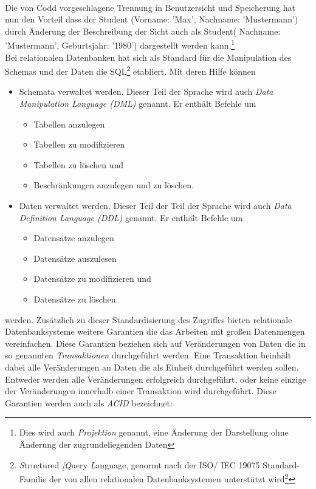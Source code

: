 \\Die von Codd vorgeschlagene Trennung in Benutzersicht und Speicherung hat nun den Vorteil dass der Student (Vorname: 'Max', Nachname: 'Mustermann') durch Änderung der Beschreibung der Sicht auch als Student( Nachname: 'Mustermann', Geburtsjahr: '1980') dargestellt werden kann.\footnote{Dies wird auch \emph{Projektion} genannt, eine Änderung der Darstellung ohne Änderung der zugrundeliegenden Daten\parencite[S. 152]{dbgrund} }
\\Bei relationalen Datenbanken hat sich als Standard für die Manipulation des Schemas und der Daten die SQL\footnote{\emph{S}tructured \emph{[Q}uery \emph{L}anguage, genormt nach der ISO/ IEC 19075 Standard-Familie der von allen relationalen Datenbanksystemen unterstützt wird\parencite{ocl_sql}\parencite{isosql}\footnote{Jeweils mit eigenen, unterschiedlich mächtigen Erweiterungen um den Anwendungsentwicklern einen Austausch des zugrundeliegenden Systems zu erschweren}} etabliert. Mit deren Hilfe können\parencite[S. 182]{dbgrund}
\begin{itemize}
	\item Schemata verwaltet werden. Dieser Teil der Sprache wird auch \emph{Data Manipulation Language (DML)} genannt. Er enthält Befehle um 
	\begin{itemize}
		\item Tabellen anzulegen
		\item Tabellen zu modifizieren
		\item Tabellen zu löschen und
		\item Beschränkungen anzulegen und zu löschen.
	\end{itemize}
	\item Daten verwaltet werden. Dieser Teil der Teil der Sprache wird auch \emph{Data Definition Language (DDL)} genannt. Er enthält Befehle um
	\begin{itemize}
		\item Datensätze anzulegen
		\item Datensätze auszulesen
		\item Datensätze zu modifizieren und
		\item Datensätze zu löschen.
	\end{itemize}
\end{itemize} werden.
Zusätzlich zu dieser Standardisierung des Zugriffes bieten relationale Datenbanksysteme weitere Garantien die das Arbeiten mit großen Datenmengen vereinfachen. Diese Garantien beziehen sich auf Veränderungen von Daten die in so genannten \emph{Transaktionen} durchgeführt werden. Eine Transaktion beinhält dabei alle Veränderungen an Daten die als Einheit durchgeführt werden sollen. Entweder werden alle Veränderungen erfolgreich durchgeführt, oder keine einzige der Veränderungen innerhalb einer Transaktion wird durchgeführt. Diese Garantien werden auch als \emph{ACID} bezeichnet:\parencite[S. 6fs]{GrayReuter93}\parencite[S. 23ff]{WeikumVossen02}
